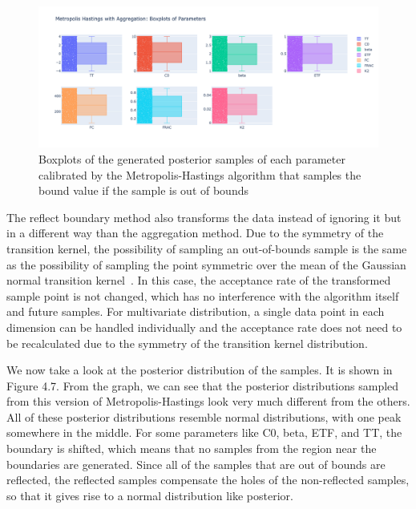 \begin{figure}[H]
    \centering
    \includegraphics[width=1\textwidth]{figures/basic_mh/aggr_mh/aggr_mh_boxplot.png}
    \captionsetup{width=.8\textwidth}
    \caption{Boxplots of the generated posterior samples of each parameter
calibrated by the Metropolis-Hastings algorithm that samples the bound value if the sample is out of bounds}
    \label{fig:enter-label}
\end{figure}



The reflect boundary method also transforms the data instead of ignoring it but in a different way than the aggregation method. Due to the symmetry of the transition kernel, the possibility of sampling an out-of-bounds sample is the same as the possibility of sampling the point symmetric over the mean of the Gaussian normal transition kernel~\cite{gaussian_distribution_property}. In this case, the acceptance rate of the transformed sample point is not changed, which has no interference with the algorithm itself and future samples. For multivariate distribution, a single data point in each dimension can be handled individually and the acceptance rate does not need to be recalculated due to the symmetry of the transition kernel distribution. 

We now take a look at the posterior distribution of the samples. It is shown in Figure 4.7. From the graph, we can see that the posterior distributions sampled from this version of Metropolis-Hastings look very much different from the others. All of these posterior distributions resemble normal distributions, with one peak somewhere in the middle. For some parameters like C0, beta, ETF, and TT, the boundary is shifted, which means that no samples from the region near the boundaries are generated. Since all of the samples that are out of bounds are reflected, the reflected samples compensate the holes of the non-reflected samples, so that it gives rise to a normal distribution like posterior.

